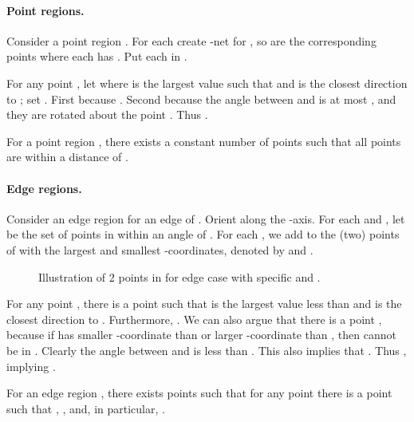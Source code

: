 \documentclass[11pt]{myclass}
\newcommand\PPic[2]{
    \begin{minipage}{#1}\hspace{-0.4cm}
        \makebox[0cm][l]{\texttt{[image: \#2]}}
    \end{minipage}}
\begin{document}
\paragraph{Point regions.}
Consider a point region .  
For each  create -net  for , so  are the corresponding points where each  has .   Put each  in .  

\parpic[r]{\PPic{1.5cm}{figs/angle}} 
For any point , let  where  is the largest value such that  and  is the closest direction to ; set .  
First  because .  
Second  because the angle between  and  is at most , and they are rotated about the point .  
Thus .  

\begin{lemma}
\label{lem:point-reg}
For a point region , there exists a constant number of points  such that all points  are within a distance  of .  
\end{lemma}

\paragraph{Edge regions.}
Consider an edge region  for an edge  of .  
Orient  along the -axis.  
For each  and , let  be the set of points in  within an angle  of .  For each , we add to  the (two) points of 
with the largest and smallest -coordinates, denoted by  and .

\begin{figure}[htb!]
\caption{Illustration of 2 points in  for edge case with specific  and . }
\label{fig:edge-case}
\end{figure}


For any point , there is a point  such that  is the largest value less than  and  is the closest direction to .  Furthermore, .  
We can also argue that there is a point , because if  has smaller -coordinate than  or larger -coordinate than , then  cannot be in .  
Clearly the angle between  and  is less than .  This also implies that .  Thus , implying .

\begin{lemma}
\label{lem:edge-reg} 
For an edge region , there exists  points  such that for any point  there is a point  such that , , and, in particular, .  
\end{lemma}
\end{document}
